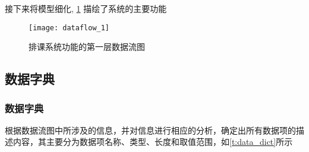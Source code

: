\documentclass{myreport}
\begin{document}
    接下来将模型细化,
    \cref{fig:dataflow_1}
    描绘了系统的主要功能
    \begin{figure}[H]
      \centering
      \texttt{[image: dataflow\_1]}
      \caption{排课系统功能的第一层数据流图}
      \label{fig:dataflow_1}
    \end{figure}

  \subsection{数据字典}
    \subsubsection{数据字典}

      根据数据流图中所涉及的信息，并对信息进行相应的分析，确定出所有数据项的描述内容，其主要分为数据项名称、类型、长度和取值范围，如\cref{t:data_dict}所示
\end{document}

